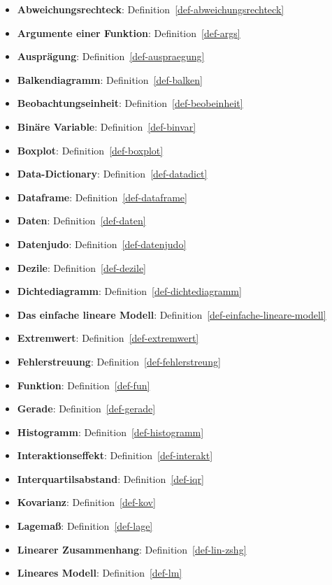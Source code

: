 \documentclass[
  letterpaper,
  oneside,
  open=any]{scrbook}
\theoremstyle{definition}
\theoremstyle{definition}
\theoremstyle{definition}
\theoremstyle{remark}
\begin{document}
\begin{itemize}
\item
  \textbf{Abweichungsrechteck}: Definition~\ref{def-abweichungsrechteck}
\item
  \textbf{Argumente einer Funktion}: Definition~\ref{def-args}
\item
  \textbf{Ausprägung}: Definition~\ref{def-auspraegung}
\item
  \textbf{Balkendiagramm}: Definition~\ref{def-balken}
\item
  \textbf{Beobachtungseinheit}: Definition~\ref{def-beobeinheit}
\item
  \textbf{Binäre Variable}: Definition~\ref{def-binvar}
\item
  \textbf{Boxplot}: Definition~\ref{def-boxplot}
\item
  \textbf{Data-Dictionary}: Definition~\ref{def-datadict}
\item
  \textbf{Dataframe}: Definition~\ref{def-dataframe}
\item
  \textbf{Daten}: Definition~\ref{def-daten}
\item
  \textbf{Datenjudo}: Definition~\ref{def-datenjudo}
\item
  \textbf{Dezile}: Definition~\ref{def-dezile}
\item
  \textbf{Dichtediagramm}: Definition~\ref{def-dichtediagramm}
\item
  \textbf{Das einfache lineare Modell}:
  Definition~\ref{def-einfache-lineare-modell}
\item
  \textbf{Extremwert}: Definition~\ref{def-extremwert}
\item
  \textbf{Fehlerstreuung}: Definition~\ref{def-fehlerstreung}
\item
  \textbf{Funktion}: Definition~\ref{def-fun}
\item
  \textbf{Gerade}: Definition~\ref{def-gerade}
\item
  \textbf{Histogramm}: Definition~\ref{def-histogramm}
\item
  \textbf{Interaktionseffekt}: Definition~\ref{def-interakt}
\item
  \textbf{Interquartilsabstand}: Definition~\ref{def-iqr}
\item
  \textbf{Kovarianz}: Definition~\ref{def-kov}
\item
  \textbf{Lagemaß}: Definition~\ref{def-lage}
\item
  \textbf{Linearer Zusammenhang}: Definition~\ref{def-lin-zshg}
\item
  \textbf{Lineares Modell}: Definition~\ref{def-lm}

\end{itemize}
\end{document}
